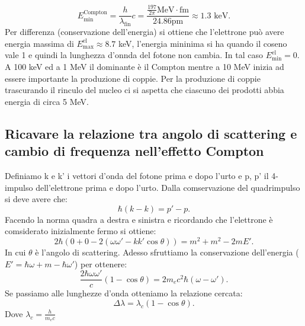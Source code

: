 \[
E^{\text{Compton}}_{\text{min}}= \frac{h}{\lambda_{\text{fin}}}c = \frac{\frac{197}{2\pi}\text{MeV}\cdot\text{fm}}{24.86 \text{pm}} \approx 1.3 \text{ keV}
.\] 
Per differenza (conservazione dell'energia) si ottiene che l'elettrone può avere energia massima di $E^{\text{el}}_{\text{max}} \approx 8.7$ keV, l'energia mininima si ha quando il coseno vale 1 e quindi la lunghezza d'onnda del fotone non cambia. In tal caso $E^{\text{el}}_{\text{min}}=0$.\\
A 100 keV ed a 1 MeV il dominante è il Compton mentre a 10 MeV inizia ad essere importante la produzione di coppie.
Per la produzione di coppie trascurando il rinculo del nucleo ci si aspetta che ciascuno dei prodotti abbia energia di circa 5 MeV.

\subsection[\hspace{1mm} ]{Ricavare la relazione tra angolo di scattering e cambio di frequenza nell'effetto Compton
}
\label{sec:4.b.22}
Definiamo k e k' i vettori d'onda del fotone prima e dopo l'urto e p, p' il 4-impulso dell'elettrone prima e dopo l'urto. Dalla comservazione del quadrimpulso si deve avere che:
\[
	\hbar\left( k- k \right)= p'-p	
.\] 
Facendo la norma quadra a destra e sinistra e ricordando che l'elettrone è comsiderato inizialmente fermo si ottiene:
\[
	2\hbar\left( 0 + 0 - 2\left( \omega\omega'- kk'\cos\theta\right) \right) = m^2+m^2- 2mE'
.\] 
In cui $\theta$ è l'angolo di scattering. Adesso sfruttiamo la conservazione dell'energia ($E' = \hbar\omega + m - \hbar\omega'$) per ottenere:
\[
	\frac{2\hbar\omega\omega'}{c}\left( 1-\cos\theta \right) = 2m_{e}c^2\hbar\left( \omega-\omega' \right) 
.\] 
Se passiamo alle lunghezze d'onda otteniamo la relazione cercata:
\[
	\Delta \lambda = \lambda_{c}\left( 1-\cos\theta \right) 
.\] 
Dove $\lambda_{c}= \frac{h}{m_{e}c}$ 



